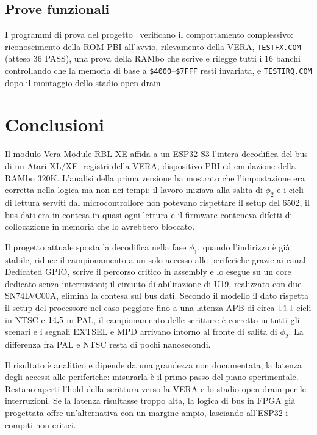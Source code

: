 \documentclass[11pt,a4paper,twoside,openright]{report}
\DeclareRobustCommand{\code}[1]{\begingroup\renewcommand{\_}{\textunderscore\allowbreak}\texttt{#1}\endgroup}
\newcommand{\sig}[1]{\textsf{#1}}
\newcommand{\hex}[1]{\texttt{\$#1}}
\begin{document}
\section{Prove funzionali}

I programmi di prova del progetto~\cite{hwreq} verificano il comportamento complessivo:
riconoscimento della ROM PBI all'avvio, rilevamento della VERA, \code{TESTFX.COM} (atteso
36 PASS), una prova della RAMbo che scrive e rilegge tutti i 16 banchi controllando che la
memoria di base a \hex{4000}--\hex{7FFF} resti invariata, e \code{TESTIRQ.COM} dopo il
montaggio dello stadio open-drain.

\chapter{Conclusioni}
\label{cap:concl}

Il modulo Vera-Module-RBL-XE affida a un ESP32-S3 l'intera decodifica del bus di un Atari
XL/XE: registri della VERA, dispositivo PBI ed emulazione della RAMbo 320K. L'analisi della
prima versione ha mostrato che l'impostazione era corretta nella logica ma non nei tempi: il
lavoro iniziava alla salita di $\phi_2$ e i cicli di lettura serviti dal microcontrollore non
potevano rispettare il setup del 6502, il bus dati era in contesa in quasi ogni lettura e il
firmware conteneva difetti di collocazione in memoria che lo avrebbero bloccato.

Il progetto attuale sposta la decodifica nella fase $\phi_1$, quando l'indirizzo è già
stabile, riduce il campionamento a un solo accesso alle periferiche grazie ai canali
Dedicated GPIO, scrive il percorso critico in assembly e lo esegue su un core dedicato
senza interruzioni; il circuito di abilitazione di U19, realizzato con due SN74LVC00A,
elimina la contesa sul bus dati. Secondo il modello il dato rispetta il setup del processore
nel caso peggiore fino a una latenza APB di circa $14{,}1$ cicli in NTSC e $14{,}5$
in PAL, il campionamento delle scritture è corretto in tutti gli scenari e i segnali
\sig{EXTSEL} e \sig{MPD} arrivano intorno al fronte di salita di $\phi_2$. La differenza fra
PAL e NTSC resta di pochi nanosecondi.

Il risultato è analitico e dipende da una grandezza non documentata, la latenza degli accessi
alle periferiche: misurarla è il primo passo del piano sperimentale. Restano aperti l'hold
della scrittura verso la VERA e lo stadio open-drain per le interruzioni. Se la latenza
risultasse troppo alta, la logica di bus in FPGA già progettata offre un'alternativa con un
margine ampio, lasciando all'ESP32 i compiti non critici.
\end{document}
